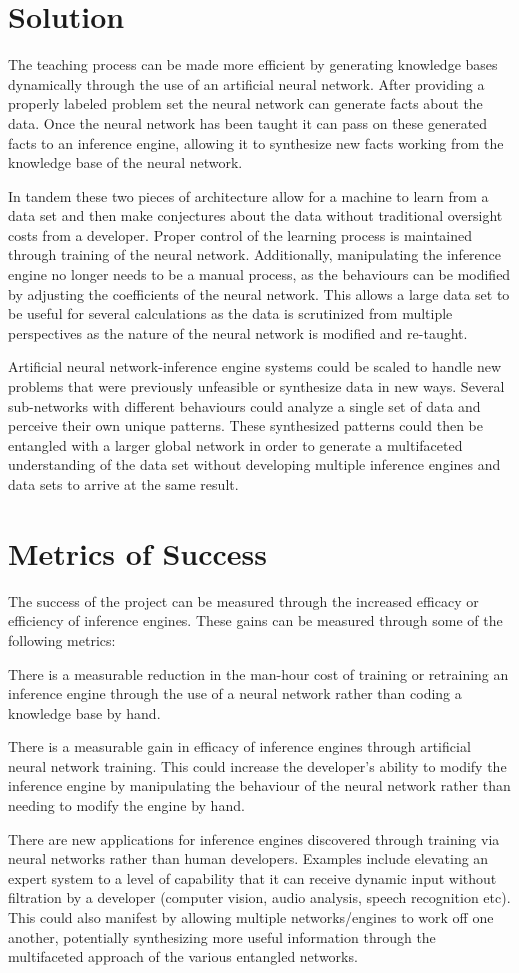 \documentclass[onecolumn, draftclsnofoot,10pt, compsoc]{IEEEtran}
\begin{document}
    \section{Solution}
    The teaching process can be made more efficient by generating knowledge bases dynamically through the use of an artificial neural network. After providing a properly labeled problem set the neural network can generate facts about the data. Once the neural network has been taught it can pass on these generated facts to an inference engine, allowing it to synthesize new facts working from the knowledge base of the neural network.
    
    In tandem these two pieces of architecture allow for a machine to learn from a data set and then make conjectures about the data without traditional oversight costs from a developer. Proper control of the learning process is maintained through training of the neural network. Additionally, manipulating the inference engine no longer needs to be a manual process, as the behaviours can be modified by adjusting the coefficients of the neural network. This allows a large data set to be useful for several calculations as the data is scrutinized from multiple perspectives as the nature of the neural network is modified and re-taught.
    
    Artificial neural network-inference engine systems could be scaled to handle new problems that were previously unfeasible or synthesize data in new ways. Several sub-networks with different behaviours could analyze a single set of data and perceive their own unique patterns. These synthesized patterns could then be entangled with a larger global network in order to generate a multifaceted understanding of the data set without developing multiple inference engines and data sets to arrive at the same result.
    \section{Metrics of Success}
    The success of the project can be measured through the increased efficacy or efficiency of inference engines. These gains can be measured through some of the following metrics:
    
    There is a measurable reduction in the man-hour cost of training or retraining an inference engine through the use of a neural network rather than coding a knowledge base by hand.
    
    There is a measurable gain in efficacy of inference engines through artificial neural network training. This could increase the developer's ability to modify the inference engine by manipulating the behaviour of the neural network rather than needing to modify the engine by hand.
    
    There are new applications for inference engines discovered through training via neural networks rather than human developers. Examples include elevating an expert system to a level of capability that it can receive dynamic input without filtration by a developer (computer vision, audio analysis, speech recognition etc). This could also manifest by allowing multiple networks/engines to work off one another, potentially synthesizing more useful information through the multifaceted approach of the various entangled networks.
    
\end{document}
